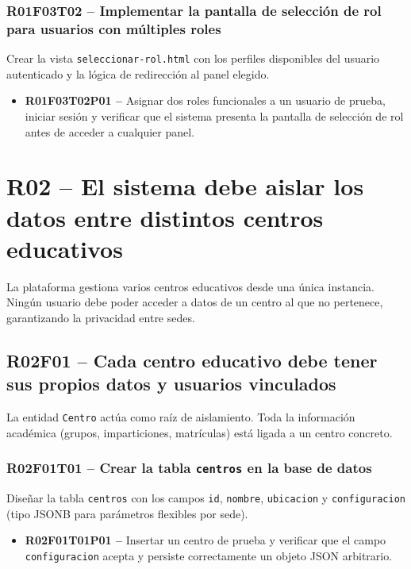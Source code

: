 \documentclass[12pt, a4paper]{report}
\begin{document}
\subsubsection{R01F03T02 -- Implementar la pantalla de selección de rol para usuarios con múltiples roles}
Crear la vista \texttt{seleccionar-rol.html} con los perfiles disponibles del usuario autenticado y la lógica de redirección al panel elegido.
\begin{itemize}
  \item \textbf{R01F03T02P01 --} Asignar dos roles funcionales a un usuario de prueba, iniciar sesión y verificar que el sistema presenta la pantalla de selección de rol antes de acceder a cualquier panel.
\end{itemize}

\section{R02 -- El sistema debe aislar los datos entre distintos centros educativos}

La plataforma gestiona varios centros educativos desde una única instancia. Ningún usuario debe poder acceder a datos de un centro al que no pertenece, garantizando la privacidad entre sedes.

\subsection{R02F01 -- Cada centro educativo debe tener sus propios datos y usuarios vinculados}

La entidad \texttt{Centro} actúa como raíz de aislamiento. Toda la información académica (grupos, imparticiones, matrículas) está ligada a un centro concreto.

\subsubsection{R02F01T01 -- Crear la tabla \texttt{centros} en la base de datos}
Diseñar la tabla \texttt{centros} con los campos \texttt{id}, \texttt{nombre}, \texttt{ubicacion} y \texttt{configuracion} (tipo JSONB para parámetros flexibles por sede).
\begin{itemize}
  \item \textbf{R02F01T01P01 --} Insertar un centro de prueba y verificar que el campo \texttt{configuracion} acepta y persiste correctamente un objeto JSON arbitrario.
\end{itemize}
\end{document}
